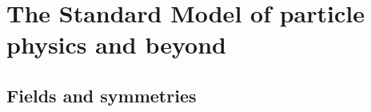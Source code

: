
\dominitoc
\tableofcontents

\newpage

\setcounter{page}{1}


\loremipsum

%
%
%
%
%
%
%

\setcounter{mtc}{1}
\chapter{The Standard Model of particle physics and beyond}
\minitoc
\newpage

    \section{Fields and symmetries}

